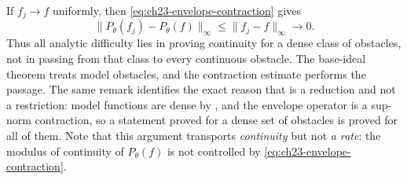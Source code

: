 \begin{example}
\label{ex:ch23-obstacle-stability}
If $f_j\to f$ uniformly, then
\eqref{eq:ch23-envelope-contraction} gives
\[
                   \|P_\theta(f_j)-P_\theta(f)\|_\infty
                   \leq\|f_j-f\|_\infty\longrightarrow0.
\]
Thus all analytic difficulty lies in proving continuity for a dense class of
obstacles, not in passing from that class to every continuous obstacle.  The
base-ideal theorem treats model obstacles, and the contraction estimate
performs the passage.  The same remark identifies the exact reason that
 is a reduction and not a
restriction: model functions are dense by
, and the envelope operator is a sup-norm
contraction, so a statement proved for a dense set of obstacles is proved for
all of them.  Note that this argument transports \emph{continuity} but not
\emph{a rate}: the modulus of continuity of $P_\theta(f)$ is not controlled
by \eqref{eq:ch23-envelope-contraction}.
\end{example}

